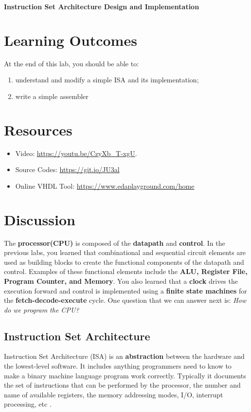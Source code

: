 \documentclass[a4paper, 11pt,oneside]{article}
\begin{document}
\begin{center}
	{\LARGE \textbf{Instruction Set Architecture Design and Implementation}}
\end{center}

\section*{Learning Outcomes}
   At the end of this lab, you should be able to:
   \begin{enumerate}[itemsep=0pt,parsep=0pt]
   	   \item understand and modify a simple ISA and its implementation;
       \item write a simple assembler
   \end{enumerate}   
\tableofcontents

\section{Resources}
\begin{itemize}
	\item Video: \href{https://youtu.be/CzyXb_T-xgU}{https://youtu.be/CzyXb\_T-xgU}.
	\item Source Codes: \href{https://git.io/JU3al}{https://git.io/JU3al}
	\item Online VHDL Tool: \href{https://www.edaplayground.com/home}
	{https://www.edaplayground.com/home}
\end{itemize}	

\section{Discussion}
The \textbf{processor(CPU)} is composed of the \textbf{datapath} and 
\textbf{control}. In the previous labs, you learned that combinational and 
sequential circuit elements are used as building blocks to create the 
functional components of the datapath and control. Examples of these functional 
elements include the \textbf{ALU, Register File, Program Counter, and Memory}. 
You also learned that a \textbf{clock} drives the execution forward and control 
is implemented using a \textbf{finite state machines} for the 
\textbf{fetch-decode-execute} cycle. One question that we can answer next is: 
\textit{How do we program the CPU?}


\subsection{Instruction Set Architecture}
Instruction Set Architecture (ISA) is an \textbf{abstraction} between the 
hardware and the lowest-level software. It includes anything programmers need 
to know to make a binary machine language program work correctly. Typically it  
documents the set of instructions that can be performed by the 
processor, the number and name of available registers, the memory 
addressing modes, I/O, interrupt processing, etc \cite{CODARM}.
\end{document}
